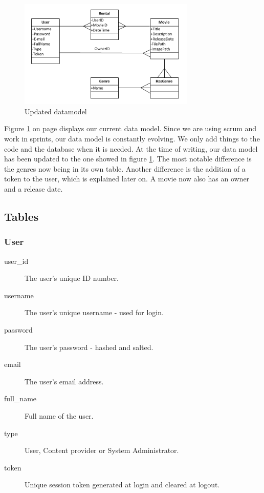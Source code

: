 \begin{figure}[h!]
  \centering
    \includegraphics[width=0.75\textwidth]{Images/Datamodel_Updated}
  \caption{Updated datamodel}
  \label{fig:Design_Database_updated}
\end{figure}

Figure \ref{fig:Design_Database_updated} on page \pageref{fig:Design_Database_updated} displays our current data model. Since we are using scrum and work in sprints, our data model is constantly evolving. We only add things to the code and the database when it is needed. At the time of writing, our data model has been updated to the one showed in figure \ref{fig:Design_Database_updated}. The most notable difference is the genres now being in its own table. Another difference is the addition of a token to the user, which is explained later on. A movie now also has an owner and a release date.

\subsection{Tables}
\label{Design_Database_Tables}

\subsubsection{User}
\label{Design_Database_Tables_User}

\begin{description}
\item[user\_id] The user's unique ID number.
\item[username] The user's unique username - used for login.
\item[password] The user's password - hashed and salted.
\item[email] The user's email address.
\item[full\_name] Full name of the user.
\item[type] User, Content provider or System Administrator.
\item[token] Unique session token generated at login and cleared at logout.
\end{description}


